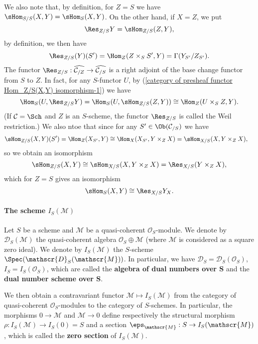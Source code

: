 We also note that, by definition, for $Z=S$ we have $\sHom_{S/S}(X,Y)=\sHom_S(X,Y)$. On the other hand, if $X=Z$, we put
\[\Res_{Z/S}Y=\sHom_{Z/S}(Z,Y),\]
by definition, we then have
\[\Res_{Z/S}(Y)(S')=\Hom_Z(Z\times_SS',Y)=\Gamma(Y_{S'}/Z_{S'}).\]
The functor $\Res_{Z/S}:\widehat{\mathcal{C}_{/Z}}\to\widehat{\mathcal{C}_{/S}}$ is a right adjoint of the base change functor from $S$ to $Z$. In fact, for any $S$-functor $U$, by (\ref{category of presheaf functor Hom_Z/S(X,Y) isomorphism-1}) we have
\[\Hom_S(U,\Res_{Z/S}Y)=\Hom_S(U,\sHom_{Z/S}(Z,Y))\cong\Hom_Z(U\times_SZ,Y).\]
(If $\mathcal{C}=\Sch$ and $Z$ is an $S$-scheme, the functor $\Res_{Z/S}$ is called the Weil restriction.) We also ntoe that since for any $S'\in\Ob(\mathcal{C}_{/S})$ we have 
\begin{align*}
\sHom_{Z/S}(X,Y)(S')&=\Hom_{Z}(X_{S'},Y)\cong\Hom_X(X_{S'},Y\times_ZX)=\sHom_{X/S}(X,Y\times_ZX),
\end{align*}
so we obtain an isomorphism
\[\sHom_{Z/S}(X,Y)\cong\sHom_{X/S}(X,Y\times_ZX)=\Res_{X/S}(Y\times_ZX),\]
which for $Z=S$ gives an isomorphism 
\[\sHom_S(X,Y)\cong \Res_{X/S}Y_X.\]

\paragraph{The scheme \texorpdfstring{$I_S(\mathscr{M})$}{I}}
\begin{definition}
Let $S$ be a scheme and $\mathscr{M}$ be a quasi-coherent $\mathscr{O}_S$-module. We denote by $\mathscr{D}_S(\mathscr{M})$ the quasi-coherent algebra $\mathscr{O}_S\oplus\mathscr{M}$ (where $\mathscr{M}$ is considered as a square zero ideal). We denote by $I_S(\mathscr{M})$ the $S$-scheme $\Spec(\mathscr{D}_S(\mathscr{M}))$. In particular, we have $\mathscr{D}_S=\mathscr{D}_S(\mathscr{O}_S)$, $I_S=I_S(\mathscr{O}_S)$, which are called the \textbf{algebra of dual numbers over $\bm{S}$} and the \textbf{dual number scheme over $\bm{S}$}.
\end{definition}

We then obtain a contravariant functor $\mathscr{M}\mapsto I_S(\mathscr{M})$ from the category of quasi-coherent $\mathscr{O}_S$-modules to the category of $S$-schemes. In particular, the morphisms $0\to\mathscr{M}$ and $\mathscr{M}\to 0$ define respectively the structural morphism $\rho:I_S(\mathscr{M})\to I_S(0)=S$ and a section $\eps_\mathscr{M}:S\to I_S(\mathscr{M})$, which is called the \textbf{zero section} of $I_S(\mathscr{M})$.\par

